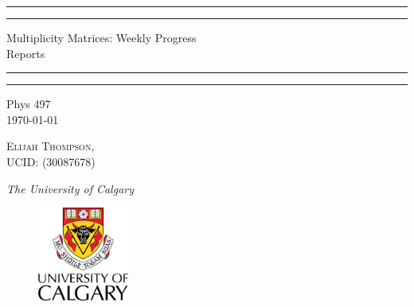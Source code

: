 \documentclass[12pt]{article}
\begin{document}

\begin{titlepage}
    \centering
    \scshape
    \vspace*{\baselineskip}
    \rule{\textwidth}{1.6pt}\vspace*{-\baselineskip}\vspace*{2pt}
    \rule{\textwidth}{0.4pt}
    
    \vspace{0.75\baselineskip}
    
    {\LARGE Multiplicity Matrices: Weekly Progress \\ \vspace{0.5\baselineskip} Reports}
    
    \vspace{0.5\baselineskip}
    
    \rule{\textwidth}{0.4pt}\vspace*{-\baselineskip}\vspace{3.2pt}
    \rule{\textwidth}{1.6pt}
    
    \vspace{2\baselineskip}
    Phys 497 \\
    \vspace*{3\baselineskip}
    \monthdayyeardate\today \\
    \vspace*{5.0\baselineskip}
    
    {\scshape\Large Elijah Thompson, \\ UCID:     (30087678) \\}
    
    \vspace{1.0\baselineskip}
    \textit{The University of Calgary}
    \vfill
    \begin{figure}[ht!]
      \begin{center}
        \includegraphics[width=3.0cm]{Logo.png}
      \end{center}
    \end{figure}
	\vspace{0.3\baselineskip} 
\end{titlepage}

\end{document}
